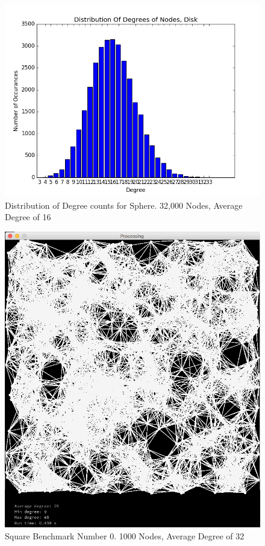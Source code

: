 \documentclass{article}
\begin{document}
\begin{center}
    \begin{figure}
        \includegraphics[scale=0.45]{./graphs/hist_deg_sphere.png}
        \caption{Distribution of Degree counts for Sphere. 32,000 Nodes, Average Degree of 16}
        \label{spheredeghist}
    \end{figure}
\end{center}

\begin{center}
    \begin{figure}
        \includegraphics[scale=0.45]{./images/square_0.png}
        \caption{Square Benchmark Number 0. 1000 Nodes, Average Degree of 32}
        \label{square0}
    \end{figure}
\end{center}
\end{document}
